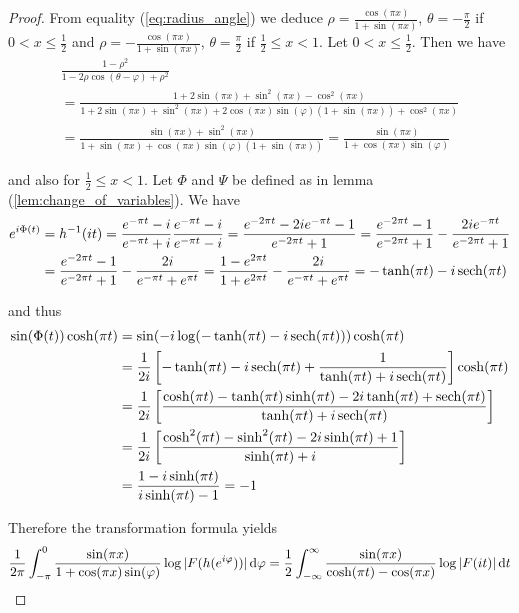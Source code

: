 \begin{proof}
	From equality (\ref{eq:radius_angle}) we deduce $\rho = \frac{\cos(\pi x)}{1 + \sin(\pi x)}$, $\theta = -\frac{\pi}{2}$ if $0 < x \leq \frac{1}{2}$ and $\rho = -\frac{\cos(\pi x)}{1 + \sin(\pi x)}$, $\theta = \frac{\pi}{2}$ if $\frac{1}{2} \leq x < 1$. Let $0 < x \leq \frac{1}{2}$. Then we have
\begin{multline*}
	\frac{1 - \rho^2}{1 - 2\rho\cos(\theta - \varphi) + \rho^2} \\= \frac{1 + 2\sin(\pi x) + \sin^2(\pi x) - \cos^2(\pi x)}{1 + 2\sin(\pi x) + \sin^2(\pi x) + 2\cos(\pi x)\sin(\varphi)(1 + \sin(\pi x)) + \cos^2(\pi x)}\\
	= \frac{\sin(\pi x) + \sin^2(\pi x)}{1 + \sin(\pi x) + \cos(\pi x)\sin(\varphi)(1 + \sin(\pi x))}
	= \frac{\sin(\pi x)}{1 + \cos(\pi x)\sin(\varphi)}
\end{multline*}

\noindent and also for $\frac{1}{2} \leq x < 1$. Let $\Phi$ and $\Psi$ be defined as in lemma (\ref{lem:change_of_variables}). We have 
\begin{align*}
	e^{i\Phi(t)} &= h^{-1}(it) = \frac{e^{-\pi t} - i}{e^{-\pi t} + i} \frac{e^{-\pi t} - i}{e^{-\pi t} - i} = \frac{e^{-2\pi t} - 2ie^{-\pi t} - 1}{e^{-2\pi t} + 1} = \frac{e^{-2\pi t} - 1}{e^{-2\pi t} + 1} - \frac{2ie^{-\pi t}}{e^{-2\pi t} + 1}\\ 
	&= \frac{e^{-2\pi t} - 1}{e^{-2\pi t} + 1} - \frac{2i}{e^{-\pi t} + e^{\pi t}} = \frac{1 - e^{2\pi t}}{1 + e^{2\pi t}} - \frac{2i}{e^{-\pi t} + e^{\pi t}} = -\tanh (\pi t) - i \operatorname{sech}(\pi t)
\end{align*}
	
\noindent and thus
\begin{align*}
	\sin( \Phi(t) )\cosh(\pi t) &= \sin( -i\log( -\tanh (\pi t) - i \sech(\pi t) )) \cosh(\pi t)\\
		&= \frac{1}{2i} \sbr[3]{ -\tanh(\pi t) - i\sech(\pi t) + \frac{1}{\tanh(\pi t) + i\sech(\pi t) }}\cosh(\pi t)\\
		&= \frac{1}{2i} \sbr[3]{ \frac{\cosh(\pi t) - \tanh(\pi t) \sinh(\pi t) - 2i\tanh(\pi t) + \sech(\pi t)}{\tanh(\pi t) + i\sech(\pi t)}}\\
		&= \frac{1}{2i} \sbr[3]{ \frac{\cosh^2(\pi t) - \sinh^2(\pi t) - 2i \sinh(\pi t) + 1}{\sinh(\pi t) + i}}\\
		&= \frac{1 - i\sinh(\pi t)}{i\sinh(\pi t) - 1} = -1
\end{align*}

Therefore the transformation formula yields
\begin{equation*}
	\frac{1}{2\pi} \int_{-\pi}^0 \frac{\sin(\pi x)}{1 + \cos(\pi x)\sin(\varphi)} \log \abs[0]{ F(h(e^{i\varphi}))} \d\varphi = \frac{1}{2}\int_{-\infty}^\infty\frac{\sin(\pi x)}{\cosh(\pi t) - \cos(\pi x)} \log\abs[0]{ F(it)} \d t
\end{equation*}
				

\end{proof}
